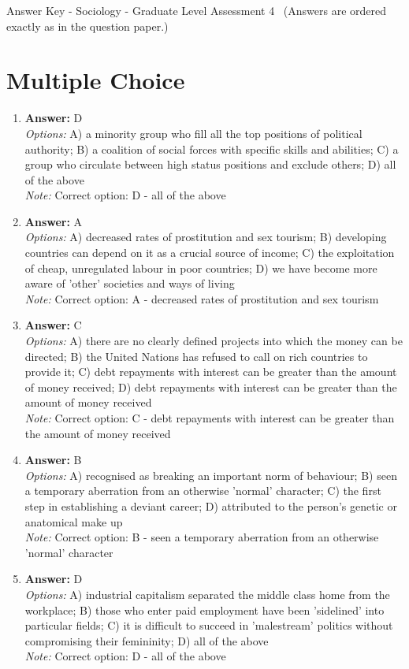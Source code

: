 \documentclass[12pt]{article}
\begin{document}
\begin{center}
Answer Key - Sociology - Graduate Level Assessment 4 \
\small (Answers are ordered exactly as in the question paper.)
\end{center}

\section*{Multiple Choice}
\begin{enumerate}[label=\arabic*.]
\item \textbf{Answer:} D
\\ \textit{Options:} A) a minority group who fill all the top positions of political authority; B) a coalition of social forces with specific skills and abilities; C) a group who circulate between high status positions and exclude others; D) all of the above
\\ \textit{Note:} Correct option: D - all of the above
\item \textbf{Answer:} A
\\ \textit{Options:} A) decreased rates of prostitution and sex tourism; B) developing countries can depend on it as a crucial source of income; C) the exploitation of cheap, unregulated labour in poor countries; D) we have become more aware of 'other' societies and ways of living
\\ \textit{Note:} Correct option: A - decreased rates of prostitution and sex tourism
\item \textbf{Answer:} C
\\ \textit{Options:} A) there are no clearly defined projects into which the money can be directed; B) the United Nations has refused to call on rich countries to provide it; C) debt repayments with interest can be greater than the amount of money received; D) debt repayments with interest can be greater than the amount of money received
\\ \textit{Note:} Correct option: C - debt repayments with interest can be greater than the amount of money received
\item \textbf{Answer:} B
\\ \textit{Options:} A) recognised as breaking an important norm of behaviour; B) seen a temporary aberration from an otherwise 'normal' character; C) the first step in establishing a deviant career; D) attributed to the person's genetic or anatomical make up
\\ \textit{Note:} Correct option: B - seen a temporary aberration from an otherwise 'normal' character
\item \textbf{Answer:} D
\\ \textit{Options:} A) industrial capitalism separated the middle class home from the workplace; B) those who enter paid employment have been 'sidelined' into particular fields; C) it is difficult to succeed in 'malestream' politics without compromising their femininity; D) all of the above
\\ \textit{Note:} Correct option: D - all of the above
\end{enumerate}
\end{document}
